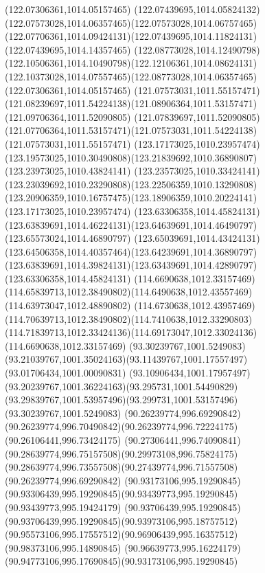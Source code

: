 {{  \moveto(122.07306361,1014.05157465)
  \curveto(122.07439695,1014.05824132)(122.07573028,1014.06357465)(122.07573028,1014.06757465)
  \curveto(122.07706361,1014.09424131)(122.07439695,1014.11824131)(122.07439695,1014.14357465)
  \curveto(122.08773028,1014.12490798)(122.10506361,1014.10490798)(122.12106361,1014.08624131)
  \curveto(122.10373028,1014.07557465)(122.08773028,1014.06357465)(122.07306361,1014.05157465)
  \moveto(121.07573031,1011.55157471)
  \curveto(121.08239697,1011.54224138)(121.08906364,1011.53157471)(121.09706364,1011.52090805)
  \lineto(121.07839697,1011.52090805)
  \curveto(121.07706364,1011.53157471)(121.07573031,1011.54224138)(121.07573031,1011.55157471)
  \moveto(123.17173025,1010.23957474)
  \curveto(123.19573025,1010.30490808)(123.21839692,1010.36890807)(123.23973025,1010.43824141)
  \curveto(123.23573025,1010.33424141)(123.23039692,1010.23290808)(123.22506359,1010.13290808)
  \curveto(123.20906359,1010.16757475)(123.18906359,1010.20224141)(123.17173025,1010.23957474)
  \moveto(123.63306358,1014.45824131)
  \curveto(123.63839691,1014.46224131)(123.64639691,1014.46490797)(123.65573024,1014.46890797)
  \curveto(123.65039691,1014.43424131)(123.64506358,1014.40357464)(123.64239691,1014.36890797)
  \curveto(123.63839691,1014.39824131)(123.63439691,1014.42890797)(123.63306358,1014.45824131)
  \moveto(114.6690638,1012.33157469)
  \curveto(114.65839713,1012.38490802)(114.6490638,1012.43557469)(114.63973047,1012.48890802)
  \curveto(114.6730638,1012.43957469)(114.70639713,1012.38490802)(114.7410638,1012.33290803)
  \curveto(114.71839713,1012.33424136)(114.69173047,1012.33024136)(114.6690638,1012.33157469)
  \moveto(93.30239767,1001.5249083)
  \curveto(93.21039767,1001.35024163)(93.11439767,1001.17557497)(93.01706434,1001.00090831)
  \curveto(93.10906434,1001.17957497)(93.20239767,1001.36224163)(93.295731,1001.54490829)
  \curveto(93.29839767,1001.53957496)(93.299731,1001.53157496)(93.30239767,1001.5249083)
  \moveto(90.26239774,996.69290842)
  \curveto(90.26239774,996.70490842)(90.26239774,996.72224175)(90.26106441,996.73424175)
  \curveto(90.27306441,996.74090841)(90.28639774,996.75157508)(90.29973108,996.75824175)
  \curveto(90.28639774,996.73557508)(90.27439774,996.71557508)(90.26239774,996.69290842)
  \moveto(90.93173106,995.19290845)
  \curveto(90.93306439,995.19290845)(90.93439773,995.19290845)(90.93439773,995.19424179)
  \curveto(90.93706439,995.19290845)(90.93706439,995.19290845)(90.93973106,995.18757512)
  \curveto(90.95573106,995.17557512)(90.96906439,995.16357512)(90.98373106,995.14890845)
  \curveto(90.96639773,995.16224179)(90.94773106,995.17690845)(90.93173106,995.19290845)
}}
